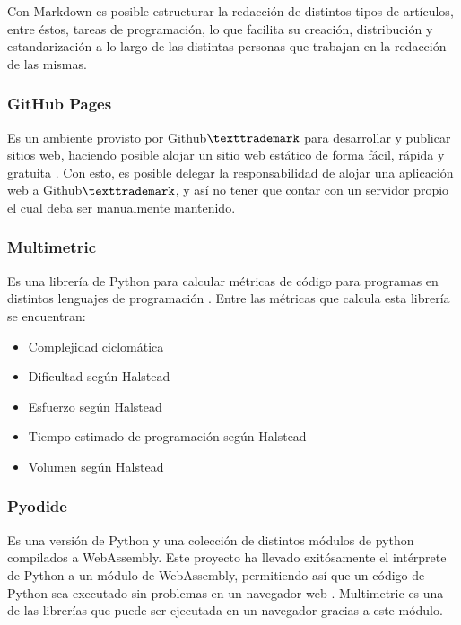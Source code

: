 \documentclass[letterpaper,12pt]{article}
\begin{document}
Con Markdown es posible estructurar la redacción de distintos tipos de artículos, entre éstos, tareas de programación, lo que facilita su creación, distribución y estandarización a lo largo de las distintas personas que trabajan en la redacción de las mismas.

\subsubsection{GitHub Pages}

Es un ambiente provisto por Github$\texttrademark$ para desarrollar y publicar sitios web, haciendo posible alojar un sitio web estático de forma fácil, rápida y gratuita \cite{Utomo_2020}. Con esto, es posible delegar la responsabilidad de alojar una aplicación web a Github$\texttrademark$, y así no tener que contar con un servidor propio el cual deba ser manualmente mantenido.

\subsubsection{Multimetric}

Es una librería de Python para calcular métricas de código para programas en distintos lenguajes de programación \cite{privkweihmann_multimetric}. Entre las métricas que calcula esta librería se encuentran:

\begin{itemize}
  \item Complejidad ciclomática
  \item Dificultad según Halstead
  \item Esfuerzo según Halstead
  \item Tiempo estimado de programación según Halstead
  \item Volumen según Halstead
\end{itemize}

\subsubsection{Pyodide}

Es una versión de Python y una colección de distintos módulos de python compilados a WebAssembly. Este proyecto ha llevado exitósamente el intérprete de Python a un módulo de WebAssembly, permitiendo así que un código de Python sea executado sin problemas en un navegador web \cite{huffman2023julia}. Multimetric es una de las librerías que puede ser ejecutada en un navegador gracias a este módulo.
\end{document}
